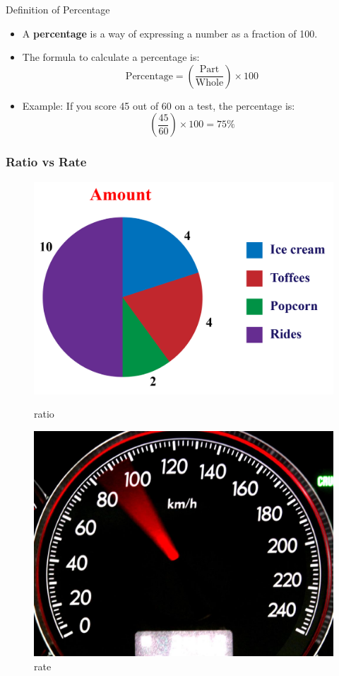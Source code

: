 \documentclass{beamer}
\begin{document}
\begin{frame}{Definition of Percentage}
    \begin{itemize}
        \item A \textbf{percentage} is a way of expressing a number as a fraction of 100.
        \item The formula to calculate a percentage is:
    \[
        \text{Percentage} = \left( \frac{\text{Part}}{\text{Whole}} \right) \times 100
    \]
        \item Example: If you score 45 out of 60 on a test, the percentage is:
    \[
        \left( \frac{45}{60} \right) \times 100 = 75\%
    \]
    \end{itemize}
\end{frame}

\begin{frame}
    \frametitle{Ratio vs Rate}
    \begin{figure}[h]    
        \begin{minipage}[b]{0.5\textwidth}
        \centering
        \includegraphics[scale=0.2]{ratio.png}
        \caption{ratio}
    \end{minipage}
    \begin{minipage}[b]{0.4\textwidth}
        \centering
        \includegraphics[scale=0.5]{rate.jpeg}
        \caption{rate}
    \end{minipage}
\end{figure}
\end{frame}
\end{document}
